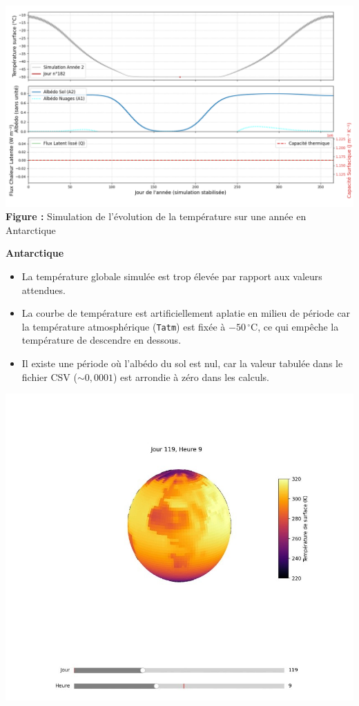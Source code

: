 \documentclass[a4paper,12pt]{article}
\begin{document}
\\

\\
  
\begin{center}
  \includegraphics[width=1\linewidth]{modele4/figures/antarctique.png}
  \textbf{Figure :} Simulation de l'évolution de la température sur une année en Antarctique
  \end{center}
\textbf{ Antarctique}
\begin{itemize}
    \item La température globale simulée est trop élevée par rapport aux valeurs attendues.
    \item La courbe de température est artificiellement aplatie en milieu de période car la température atmosphérique (\texttt{Tatm}) est fixée à $-50\,^\circ$C, ce qui empêche la température de descendre en dessous.
    \item Il existe une période où l’albédo du sol est nul, car la valeur tabulée dans le fichier CSV ($\sim 0{,}0001$) est arrondie à zéro dans les calculs.
\end{itemize}

  \begin{center}
  \includegraphics[width=1\linewidth]{modele4/figures/plan1.jpg}
  
  \end{center}
\end{document}
